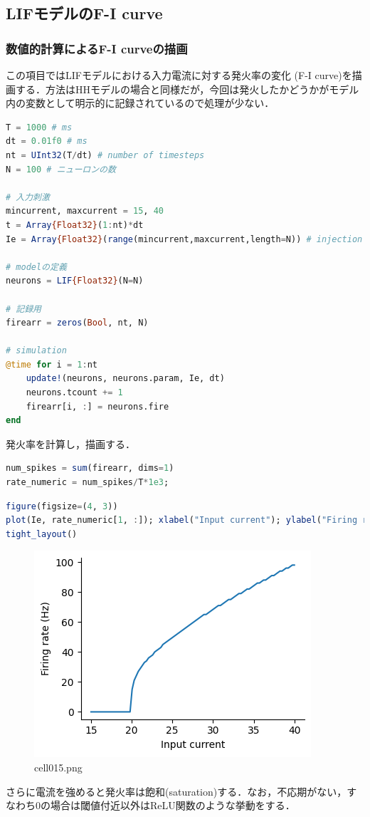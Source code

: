 \subsection{LIFモデルのF-I curve}
\subsubsection{数値的計算によるF-I curveの描画}
この項目ではLIFモデルにおける入力電流に対する発火率の変化 (F-I curve)を描画する．方法はHHモデルの場合と同様だが，今回は発火したかどうかがモデル内の変数として明示的に記録されているので処理が少ない．
\begin{lstlisting}[language=julia]
T = 1000 # ms
dt = 0.01f0 # ms
nt = UInt32(T/dt) # number of timesteps
N = 100 # ニューロンの数

# 入力刺激
mincurrent, maxcurrent = 15, 40
t = Array{Float32}(1:nt)*dt
Ie = Array{Float32}(range(mincurrent,maxcurrent,length=N)) # injection current

# modelの定義
neurons = LIF{Float32}(N=N)

# 記録用
firearr = zeros(Bool, nt, N)

# simulation
@time for i = 1:nt
    update!(neurons, neurons.param, Ie, dt)
    neurons.tcount += 1
    firearr[i, :] = neurons.fire
end
\end{lstlisting}
発火率を計算し，描画する．
\begin{lstlisting}[language=julia]
num_spikes = sum(firearr, dims=1)
rate_numeric = num_spikes/T*1e3; 
\end{lstlisting}
\begin{lstlisting}[language=julia]
figure(figsize=(4, 3))
plot(Ie, rate_numeric[1, :]); xlabel("Input current"); ylabel("Firing rate (Hz)")
tight_layout()
\end{lstlisting}
\begin{figure}[ht]
	\centering
	\includegraphics[scale=0.8, max width=\linewidth]{./fig/neuron-model/lif/cell015.png}
	\caption{cell015.png}
	\label{cell015.png}
\end{figure}
さらに電流を強めると発火率は飽和(saturation)する．なお，不応期がない，すなわち0の場合は閾値付近以外はReLU関数のような挙動をする．
